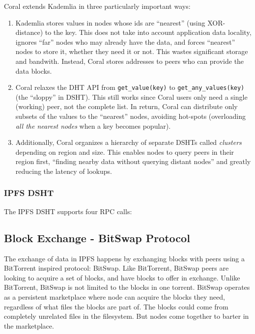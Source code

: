 \documentclass{sig-alternate}
\begin{document}
Coral extends Kademlia in three particularly important ways:

\begin{enumerate}

  \item Kademlia stores values in nodes whose ids are ``nearest'' (using
        XOR-distance) to the key. This does not take into account application
        data locality, ignores ``far'' nodes who may already have the data, and
        forces ``nearest'' nodes to store it, whether they need it or not.
        This wastes significant storage and bandwith. Instead, Coral stores
        addresses to peers who can provide the data blocks.

  \item Coral relaxes the DHT API from \texttt{get\_value(key)} to
        \texttt{get\_any\_values(key)} (the ``sloppy'' in DSHT).
        This still works since Coral users only need a single (working) peer,
        not the complete list. In return, Coral can distribute only subsets of
        the values to the ``nearest'' nodes, avoiding hot-spots (overloading
        \textit{all the nearest nodes} when a key becomes popular).

  \item Additionally, Coral organizes a hierarchy of separate DSHTs called
        \textit{clusters} depending on region and size. This enables nodes to
        query peers in their region first, ``finding nearby data without
        querying distant nodes'' and greatly reducing the latency of
        lookups.

\end{enumerate}


\subsubsection{IPFS DSHT}

The IPFS DSHT supports four RPC calls:



\subsection{Block Exchange - BitSwap Protocol}

The exchange of data in IPFS happens by exchanging blocks with peers using a
BitTorrent inspired protocol: BitSwap. Like BitTorrent, BitSwap peers are
looking to acquire a set of blocks, and have blocks to offer in exchange.
Unlike BitTorrent, BitSwap is not limited to the blocks in one torrent.
BitSwap operates as a persistent marketplace where node can acquire the
blocks they need, regardless of what files the blocks are part of. The
blocks could come from completely unrelated files in the filesystem.
But nodes come together to barter in the marketplace.
\end{document}
